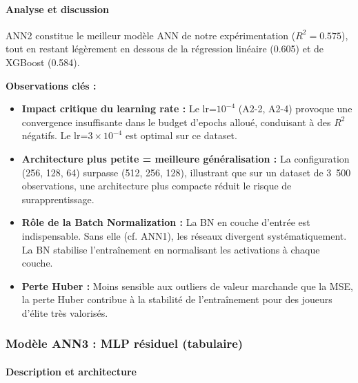 \documentclass[12pt,a4paper]{article}
\begin{document}
\paragraph{Analyse et discussion}

ANN2 constitue le meilleur modèle ANN de notre expérimentation ($R^2 = 0.575$), tout
en restant légèrement en dessous de la régression linéaire (0.605) et de XGBoost
(0.584).

\textbf{Observations clés :}

\begin{itemize}[leftmargin=*]
    \item \textbf{Impact critique du learning rate :} Le lr=$10^{-4}$ (A2-2, A2-4)
    provoque une convergence insuffisante dans le budget d'epochs alloué, conduisant
    à des $R^2$ négatifs. Le lr=$3\times10^{-4}$ est optimal sur ce dataset.

    \item \textbf{Architecture plus petite = meilleure généralisation :} La
    configuration (256, 128, 64) surpasse (512, 256, 128), illustrant que sur un
    dataset de 3~500 observations, une architecture plus compacte réduit le risque de
    surapprentissage.

    \item \textbf{Rôle de la Batch Normalization :} La BN en couche d'entrée est
    indispensable. Sans elle (cf. ANN1), les réseaux divergent systématiquement. La
    BN stabilise l'entraînement en normalisant les activations à chaque couche.

    \item \textbf{Perte Huber :} Moins sensible aux outliers de valeur marchande que
    la MSE, la perte Huber contribue à la stabilité de l'entraînement pour des
    joueurs d'élite très valorisés.
\end{itemize}

\newpage

\subsubsection{Modèle ANN3 : MLP résiduel (tabulaire)}

\paragraph{Description et architecture}
\end{document}
